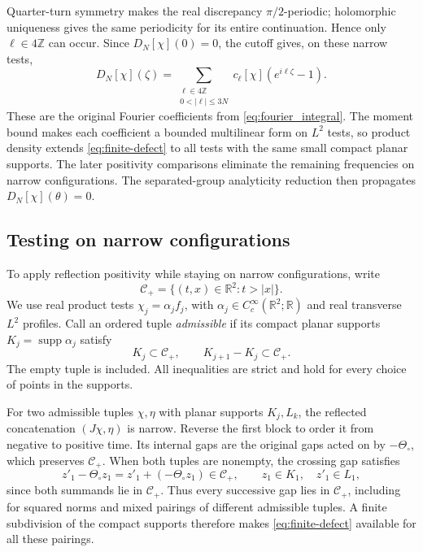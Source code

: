 \documentclass[11pt, letterpaper, reqno]{amsart}
\theoremstyle{definition}
\theoremstyle{remark}
\newcommand{\bbR}{\mathbb{R}}
\newcommand{\bbZ}{\mathbb{Z}}
\newcommand{\calC}{\mathcal{C}}
\begin{document}
Quarter-turn symmetry makes the real discrepancy $\pi/2$-periodic;
holomorphic uniqueness gives the same periodicity for its entire
continuation. Hence only $\ell\in4\bbZ$ can occur. Since
$D_N[\chi](0)=0$, the cutoff gives, on these narrow tests,
\begin{equation}\label{eq:finite-defect}
 D_N[\chi](\zeta)
 =\sum_{\substack{\ell\in4\bbZ\\0<|\ell|\le3N}}
     c_\ell[\chi](e^{i\ell\zeta}-1).
\end{equation}
These are the original Fourier coefficients from
\eqref{eq:fourier_integral}. The moment bound makes each coefficient
a bounded multilinear form on $L^2$ tests, so product density extends
\eqref{eq:finite-defect} to all tests with the same small compact planar
supports. The later positivity comparisons eliminate the remaining
frequencies on narrow configurations. The separated-group analyticity
reduction then propagates $D_N[\chi](\theta)=0$.


\subsection{Testing on narrow configurations}\label{subsec:narrow-testing}

To apply reflection positivity while staying on narrow configurations,
write
\begin{equation}
 \calC_+=\{(t,x)\in\bbR^2:t>|x|\}.
\end{equation}
We use real product tests $\chi_j=\alpha_jf_j$, with
$\alpha_j\in C_c^\infty(\bbR^2;\bbR)$ and real transverse
$L^2$ profiles. Call an ordered tuple \emph{admissible} if its
compact planar supports $K_j=\operatorname{supp}\alpha_j$ satisfy
\begin{equation}\label{eq:admissible-supports}
 K_j\subset\calC_+,\qquad K_{j+1}-K_j\subset\calC_+.
\end{equation}
The empty tuple is included. All inequalities are strict and hold
for every choice of points in the supports.

For two admissible tuples $\chi,\eta$ with planar supports $K_j,L_k$,
the reflected concatenation
$(J\chi,\eta)$ is narrow. Reverse the first block to order it from
negative to positive time. Its internal gaps are the original gaps
acted on by $-\Theta_\circ$, which preserves $\calC_+$.
When both tuples are nonempty, the crossing gap satisfies
\begin{equation}\label{eq:narrow-crossing}
 z'_1-\Theta_\circ z_1=z'_1+(-\Theta_\circ z_1)\in\calC_+,
 \qquad z_1\in K_1,\quad z'_1\in L_1,
\end{equation}
since both summands lie in $\calC_+$. Thus every successive gap
lies in $\calC_+$, including for squared norms and mixed pairings
of different admissible tuples. A finite subdivision of the compact
supports therefore makes \eqref{eq:finite-defect} available for
all these pairings.
\end{document}

